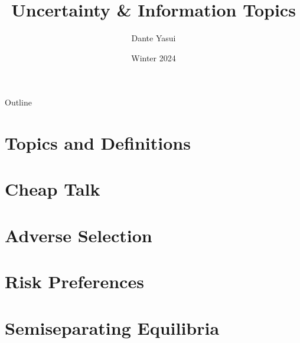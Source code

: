 \documentclass{beamer}
\title{Uncertainty \& Information Topics}
\author{Dante Yasui }
\institute{EC327 Game Theory}
\date{Winter 2024}
\theoremstyle{plain}
\begin{document}
\begin{frame}[plain]
    \titlepage
\end{frame}
\addtocounter{framenumber}{-1}

\begin{frame}[plain]{Outline}
  \tableofcontents
\end{frame}
\addtocounter{framenumber}{-1}


\section{Topics and Definitions}


\section{Cheap Talk}


\section{Adverse Selection}


\section{Risk Preferences}


\section{Semiseparating Equilibria}



\end{document}
